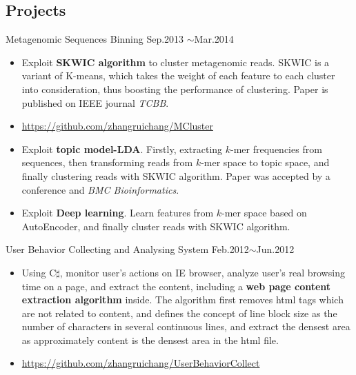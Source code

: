 \documentclass[margin]{res}
\begin{document}
\begin{resume}
\section{Projects}
Metagenomic Sequences Binning \hfill Sep.2013 $\sim$Mar.2014
\begin{spacing}{0.02}
\end{spacing}
\begin{itemize}
\item Exploit \textbf{SKWIC algorithm} to cluster metagenomic reads. SKWIC is a variant of K-means, which takes the weight of each feature to each cluster into consideration, thus boosting the performance of clustering. Paper is published on IEEE journal \emph{TCBB}.
\item \url{https://github.com/zhangruichang/MCluster}
\item Exploit \textbf{topic model-LDA}. Firstly, extracting $k$-mer frequencies from sequences, then transforming reads from $k$-mer space to topic space, and finally clustering reads with SKWIC algorithm. Paper was accepted by a conference and \emph{BMC Bioinformatics}.
\item Exploit \textbf{Deep learning}. Learn features from $k$-mer space based on AutoEncoder, and finally cluster reads with SKWIC algorithm.
\end{itemize}
User Behavior Collecting and Analysing System \hfill Feb.2012$\sim$Jun.2012
\begin{spacing}{0.1}
\end{spacing}
\begin{itemize}
\item Using C$\sharp$, monitor user's actions on IE browser, analyze user's real browsing time on a page, and extract the content, including a \textbf{web page content extraction algorithm} inside. The algorithm first removes html tags which are not related to content, and defines the concept of line block size as the number of characters in several continuous lines, and extract the densest area as approximately content is the densest area in the html file.
\item \url{https://github.com/zhangruichang/UserBehaviorCollect}
\end{itemize}

\end{resume}
\end{document}
